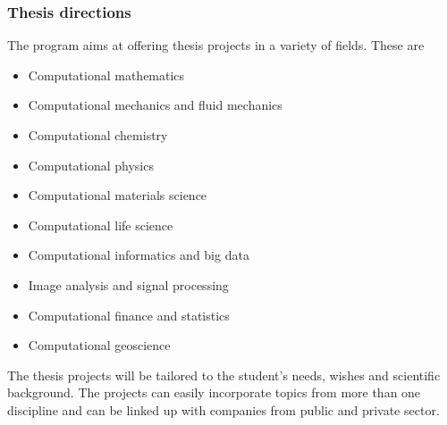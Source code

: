 \documentclass{beamer}
\begin{document}
\begin{frame}
\frametitle{Thesis directions}

\begin{block}{}
The program aims at offering thesis projects in a variety of fields. These are

\begin{itemize}
\item Computational mathematics

\item Computational mechanics and fluid mechanics 

\item Computational chemistry

\item Computational physics

\item Computational materials science

\item Computational life science

\item Computational informatics and big data

\item Image analysis and signal processing

\item Computational finance and statistics 

\item Computational geoscience
\end{itemize}

\noindent
The thesis projects will be tailored to the student's needs, wishes and scientific background. The projects can easily incorporate topics from more than one discipline and can be linked up with companies from public and private sector.
\end{block}
\end{frame}
\end{document}
